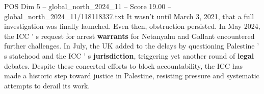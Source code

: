 \begin{textsample}{POS Dim 5 – global\_north\_2024\_11 – Score 19.00 – global\_north\_2024\_11/118118337.txt}
It wasn't until March 3, 2021, that a full investigation was finally launched.
Even then, obstruction persisted.
In May 2024, the ICC ' s request for arrest \textbf{warrants} for Netanyahu and Gallant encountered further challenges.
In July, the UK added to the delays by questioning Palestine ' s statehood and the ICC ' s \textbf{jurisdiction}, triggering yet another round of \textbf{legal} debates.
Despite these concerted efforts to block accountability, the ICC has made a historic step toward justice in Palestine, resisting pressure and systematic attempts to derail its work.

\end{textsample}
